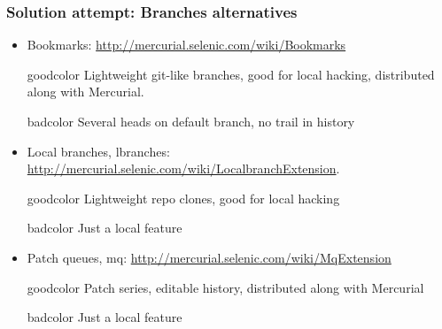 \documentclass{beamer}
\begin{document}
\begin{frame} 
\frametitle{Solution attempt: Branches alternatives}
\begin{itemize}
\item Bookmarks: \url{http://mercurial.selenic.com/wiki/Bookmarks}
\begin{beamercolorbox}[rounded=true,center,shadow=true, wd=0.9\textwidth]{goodcolor}
Lightweight git-like branches, good for local hacking, distributed along with Mercurial. 
\end{beamercolorbox}
\begin{beamercolorbox}[rounded=true,center,shadow=true, wd=0.9\textwidth]{badcolor}
Several heads on default branch, no trail in history
\end{beamercolorbox}
\item Local branches, lbranches: \url{http://mercurial.selenic.com/wiki/LocalbranchExtension}. 
\begin{beamercolorbox}[rounded=true,center,shadow=true, wd=0.9\textwidth]{goodcolor}
Lightweight repo clones, good for local hacking
\end{beamercolorbox}
\begin{beamercolorbox}[rounded=true,center,shadow=true, wd=0.9\textwidth]{badcolor}
Just a local feature
\end{beamercolorbox}
\item Patch queues, mq: \url{http://mercurial.selenic.com/wiki/MqExtension} 
\begin{beamercolorbox}[rounded=true,center,shadow=true, wd=0.9\textwidth]{goodcolor}
Patch series, editable history, distributed along with Mercurial
\end{beamercolorbox}
\begin{beamercolorbox}[rounded=true,center,shadow=true, wd=0.9\textwidth]{badcolor}
Just a local feature
\end{beamercolorbox}
\end{itemize}
\end{frame}
\end{document}
